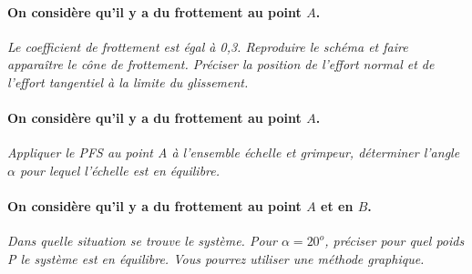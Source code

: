 \documentclass[10pt,oneside]{article}
\begin{document}
\paragraph{On considère qu'il y a du frottement au point $A$.}
\textit{Le coefficient de frottement est égal à 0,3. Reproduire le schéma et faire apparaître le cône de frottement. Préciser la position de l'effort normal et de l'effort tangentiel à la limite du glissement.}
 

\paragraph{On considère qu'il y a du frottement au point $A$.}
\textit{Appliquer le PFS au point A à l'ensemble échelle et grimpeur, déterminer l'angle $\alpha$ pour lequel l'échelle est en équilibre.}

\paragraph{On considère qu'il y a du frottement au point $A$ et en $B$.}
\textit{Dans quelle situation se trouve le système. Pour $\alpha=20^o$, préciser pour quel poids P le système est en équilibre. Vous pourrez utiliser une méthode graphique.}
\end{document}
